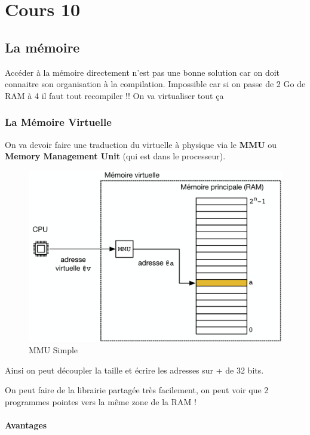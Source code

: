 \section{Cours 10}\label{cours-10}

\subsection{La mémoire}\label{la-muxe9moire}

Accéder à la mémoire directement n'est pas une bonne solution car on
doit connaitre son organisation à la compilation. Impossible car si on
passe de 2 Go de RAM à 4 il faut tout recompiler !! On va virtualiser
tout ça

\subsubsection{La Mémoire Virtuelle}\label{la-muxe9moire-virtuelle}

On va devoir faire une traduction du virtuelle à physique via le
\textbf{MMU} ou \textbf{Memory Management Unit} (qui est dans le
processeur).

\begin{figure}
\centering
\includegraphics{image-52.png}
\caption{MMU Simple}
\end{figure}

Ainsi on peut découpler la taille et écrire les adresses sur + de 32
bits.

On peut faire de la librairie partagée très facilement, on peut voir que
2 programmes pointes vers la même zone de la RAM !

\paragraph{Avantages}\label{avantages}

